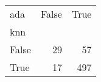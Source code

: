 \begin{tabular}{lrr}
\toprule
ada &  False &  True  \\
knn   &        &        \\
\midrule
False &     29 &     57 \\
True  &     17 &    497 \\
\bottomrule
\end{tabular}
